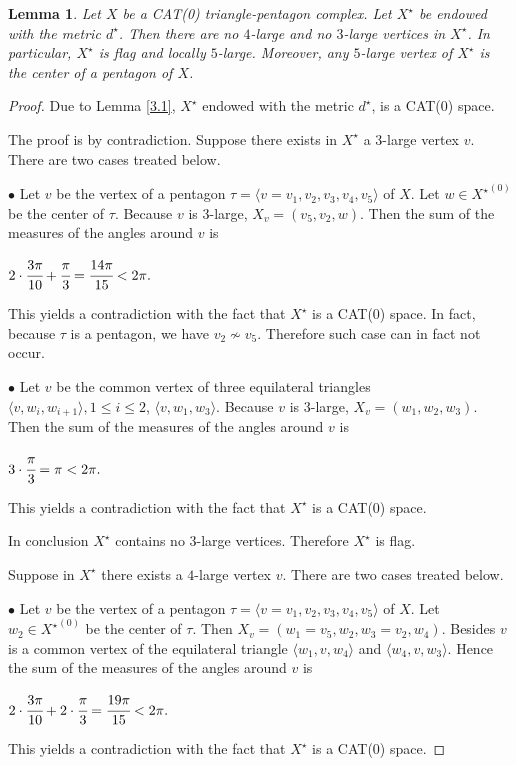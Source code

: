 \documentclass{amsart}
\newtheorem{lemma}[theorem]{Lemma}
\theoremstyle{definition}
\theoremstyle{remark}
\numberwithin{equation}{section}
\begin{document}
\begin{lemma}\label{3.2}
Let $X$ be a CAT(0) triangle-pentagon complex.  Let $X^{\star}$ be endowed with the metric $d^{\star}$.  Then there are no $4$-large and no $3$-large vertices in $X^{\star}$. In particular, $X^{\star}$ is flag and locally $5$-large. Moreover, any $5$-large vertex of $X^{\star}$ is the center of a pentagon of $X$.
\end{lemma}

\begin{proof}
Due to Lemma \ref{3.1}, $X^{\star}$ endowed with the metric $d^{\star}$, is a CAT(0) space.

The proof is by contradiction.
Suppose there exists in $X^{\star}$ a $3$-large vertex $v$. There are two cases treated below.

 $\bullet$ Let $v$ be the vertex of a pentagon $\tau = \langle v = v_{1}, v_{2}, v_{3}, v_{4}, v_{5} \rangle$ of $X$. Let $w \in {X^{\star}}^{(0)}$ be the center of $\tau$. Because $v$ is $3$-large, $X_{v} = (v_{5}, v_{2}, w)$. Then the sum of the measures of the angles around $v$ is
 \begin{center}
$2 \cdot \cfrac{3 \pi}{10} + \cfrac{\pi}{3} = \cfrac{14 \pi}{15} < 2 \pi.$
 \end{center} This yields a contradiction with the fact that $X^{\star}$ is a CAT(0) space. In fact, because $\tau$ is a pentagon, we have $v_{2} \nsim v_{5}$. Therefore such case can in fact not occur.
 
 $\bullet$ Let $v$ be the common vertex of three equilateral triangles $\langle v,w_{i},w_{i+1} \rangle, 1 \leq i \leq 2$, $\langle v,w_{1},w_{3} \rangle$. Because $v$ is $3$-large, $X_{v} = (w_{1}, w_{2}, w_{3})$. Then the sum of the measures of the angles around $v$ is
 \begin{center}
$3 \cdot \cfrac{\pi}{3} = \pi < 2 \pi.$
 \end{center}This yields a contradiction with the fact that $X^{\star}$ is a CAT(0) space. 

 In conclusion $X^{\star}$ contains no $3$-large vertices. Therefore $X^{\star}$ is flag.

Suppose in $X^{\star}$ there exists a $4$-large vertex $v$. There are two cases treated below.

$\bullet$ Let $v$ be the vertex of a pentagon  $\tau = \langle v = v_{1}, v_{2}, v_{3}, v_{4}, v_{5} \rangle$ of $X$. Let $w_{2} \in {X^{\star}}^{(0)}$ be the center of $\tau$. Then $X_{v} = (w_{1}=v_{5}, w_{2}, w_{3}=v_{2}, w_{4})$. Besides $v$ is a common vertex of the equilateral triangle $\langle w_{1},v,w_{4} \rangle$ and $\langle w_{4},v,w_{3} \rangle$. Hence the sum of the measures of the angles around $v$ is
\begin{center}
$2 \cdot \cfrac{3 \pi}{10} + 2 \cdot \cfrac{\pi}{3} = \cfrac{19 \pi}{15} < 2 \pi.$
\end{center} This yields a contradiction with the fact that $X^{\star}$ is a CAT(0) space. 


\end{proof}
\end{document}
